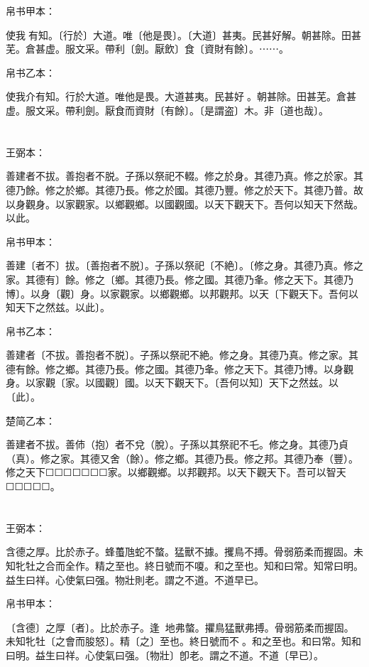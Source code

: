 \documentclass[a5paper]{ctexbook}
\begin{document}
    
    帛书甲本：

    使我𢴲有知。〔行於〕大道。唯〔他是畏〕。〔大道〕甚夷。民甚好解。朝甚除。田甚芜。倉甚虚。服文采。帶利〔劍。厭飲〕食〔資財有餘〕。⋯⋯。

    帛书乙本：

    使我介有知。行於大道。唯他是畏。大道甚夷。民甚好𠎿。朝甚除。田甚芜。倉甚虚。服文采。帶利劍。厭食而資財〔有餘〕。〔是謂盗〕木。非〔道也哉〕。

    \chapter{}
    王弼本：

    善建者不拔。善抱者不脱。子孫以祭祀不輟。修之於身。其德乃真。修之於家。其德乃餘。修之於鄉。其德乃長。修之於國。其德乃豐。修之於天下。其德乃普。故以身觀身。以家觀家。以鄉觀鄉。以國觀國。以天下觀天下。吾何以知天下然哉。以此。

    
    帛书甲本：

    善建〔者不〕拔。〔善抱者不脱〕。子孫以祭祀〔不絶〕。〔修之身。其德乃真。修之家。其德有〕餘。修之〔鄉。其德乃長。修之國。其德乃夆。修之天下。其德乃博〕。以身〔觀〕身。以家觀家。以鄉觀鄉。以邦觀邦。以天〔下觀天下。吾何以知天下之然兹。以此〕。

    帛书乙本：

    善建者〔不拔。善抱者不脱〕。子孫以祭祀不絶。修之身。其德乃真。修之家。其德有餘。修之鄉。其德乃長。修之國。其德乃夆。修之天下。其德乃博。以身觀身。以家觀〔家。以國觀〕國。以天下觀天下。〔吾何以知〕天下之然兹。以〔此〕。

    楚简乙本：

    善建者不拔。善伂（抱）者不兌（脫）。子孫以其祭祀不乇。修之身。其德乃貞（真）。修之家。其德又舍（餘）。修之鄉。其德乃長。修之邦。其德乃奉（豐）。修之天下☐☐☐☐☐☐☐家。以鄉觀鄉。以邦觀邦。以天下觀天下。吾可以智天☐☐☐☐☐。

    \chapter{}
    王弼本：

    含德之厚。比於赤子。蜂蠆虺蛇不螫。猛獸不據。攫鳥不搏。骨弱筋柔而握固。未知牝牡之合而全作。精之至也。終日號而不嗄。和之至也。知和曰常。知常曰明。益生曰祥。心使氣曰强。物壯則老。謂之不道。不道早已。

    
    帛书甲本：

    〔含德〕之厚〔者〕。比於赤子。逢𢔯𧍥地弗螫。㩴鳥猛獸弗搏。骨弱筋柔而握固。未知牝牡〔之會而朘怒〕。精〔之〕至也。終日號而不𢖻。和之至也。和曰常。知和曰明。益生曰祥。心使氣曰强。〔物壯〕卽老。謂之不道。不道〔早已〕。
\end{document}
